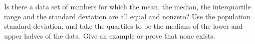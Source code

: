Is there a data set of numbers for which the mean, the median, the interquartile range and the standard deviation are all equal and nonzero? Use the population standard deviation, and take the quartiles to be the medians of the lower and upper halves of the data. Give an example or prove that none exists.
